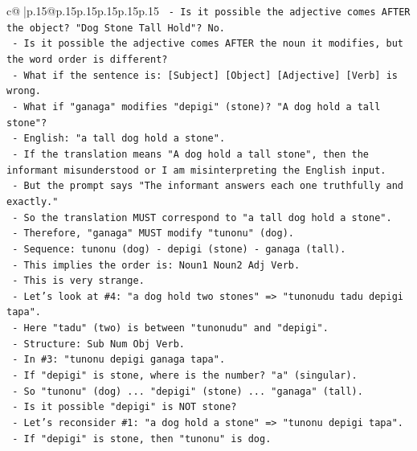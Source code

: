 \documentclass{article}
\begin{document}
{\begin{supertabular}{c@{$\;$}|p{.15\linewidth}@{}p{.15\linewidth}p{.15\linewidth}p{.15\linewidth}p{.15\linewidth}p{.15\linewidth}}
{{{\texttt{          {-} Is it possible the adjective comes AFTER the object? "Dog Stone Tall Hold"? No.} \\
\texttt{          {-} Is it possible the adjective comes AFTER the noun it modifies, but the word order is different?} \\
\texttt{          {-} What if the sentence is: {[}Subject{]} {[}Object{]} {[}Adjective{]} {[}Verb{]} is wrong.} \\
\texttt{          {-} What if "ganaga" modifies "depigi" (stone)? "A dog hold a tall stone"?} \\
\texttt{            {-} English: "a tall dog hold a stone".} \\
\texttt{            {-} If the translation means "A dog hold a tall stone", then the informant misunderstood or I am misinterpreting the English input.} \\
\texttt{            {-} But the prompt says "The informant answers each one truthfully and exactly."} \\
\texttt{            {-} So the translation MUST correspond to "a tall dog hold a stone".} \\
\texttt{            {-} Therefore, "ganaga" MUST modify "tunonu" (dog).} \\
\texttt{            {-} Sequence: tunonu (dog) {-} depigi (stone) {-} ganaga (tall).} \\
\texttt{            {-} This implies the order is: Noun1 Noun2 Adj Verb.} \\
\texttt{            {-} This is very strange.} \\
\texttt{            {-} Let's look at \#4: "a dog hold two stones" => "tunonudu tadu depigi tapa".} \\
\texttt{            {-} Here "tadu" (two) is between "tunonudu" and "depigi".} \\
\texttt{            {-} Structure: Sub Num Obj Verb.} \\
\texttt{            {-} In \#3: "tunonu depigi ganaga tapa".} \\
\texttt{            {-} If "depigi" is stone, where is the number? "a" (singular).} \\
\texttt{            {-} So "tunonu" (dog) ... "depigi" (stone) ... "ganaga" (tall).} \\
\texttt{            {-} Is it possible "depigi" is NOT stone?} \\
\texttt{            {-} Let's reconsider \#1: "a dog hold a stone" => "tunonu depigi tapa".} \\
\texttt{            {-} If "depigi" is stone, then "tunonu" is dog.} \\
}}}
\end{supertabular}}
\end{document}
